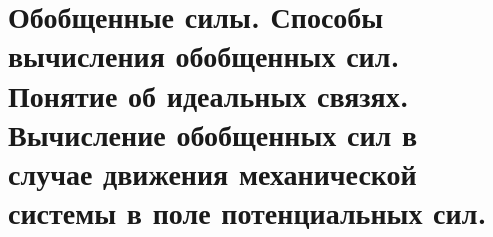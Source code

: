 \chapter{Обобщенные силы. Способы вычисления обобщенных сил. Понятие об
идеальных связях. Вычисление обобщенных сил в случае движения механической
системы в поле потенциальных сил.}

\newpage
